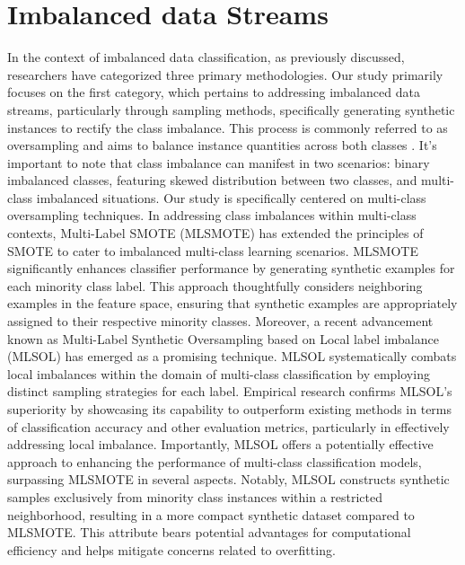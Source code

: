 %
%
\section{Imbalanced data Streams}
\label{sec:3_3_imbalanced}
In the context of imbalanced data classification, as previously discussed, researchers have categorized three primary methodologies\cite{yin2022graph}. Our study primarily focuses on the first category, which pertains to addressing imbalanced data streams, particularly through sampling methods, specifically generating synthetic instances to rectify the class imbalance. This process is commonly referred to as oversampling\cite{ren2023grouping} and aims to balance instance quantities across both classes \cite{nitesh2002smote,han2005borderline,bunkhumpornpat2009safe,maciejewski2011local} . It's important to note that class imbalance can manifest in two scenarios: binary imbalanced classes, featuring skewed distribution between two classes, and multi-class imbalanced situations. Our study is specifically centered on multi-class oversampling techniques. In addressing class imbalances within multi-class contexts, Multi-Label SMOTE (MLSMOTE) \cite{charte2015mlsmote} has extended the principles of SMOTE to cater to imbalanced multi-class learning scenarios. MLSMOTE significantly enhances classifier performance by generating synthetic examples for each minority class label. This approach thoughtfully considers neighboring examples in the feature space, ensuring that synthetic examples are appropriately assigned to their respective minority classes. Moreover, a recent advancement known as Multi-Label Synthetic Oversampling based on Local label imbalance (MLSOL) \cite{yin2022graph} has emerged as a promising technique. MLSOL systematically combats local imbalances within the domain of multi-class classification by employing distinct sampling strategies for each label. Empirical research confirms MLSOL's superiority by showcasing its capability to outperform existing methods in terms of classification accuracy and other evaluation metrics, particularly in effectively addressing local imbalance. Importantly, MLSOL offers a potentially effective approach to enhancing the performance of multi-class classification models, surpassing MLSMOTE in several aspects. Notably, MLSOL constructs synthetic samples exclusively from minority class instances within a restricted neighborhood, resulting in a more compact synthetic dataset compared to MLSMOTE. This attribute bears potential advantages for computational efficiency and helps mitigate concerns related to overfitting.